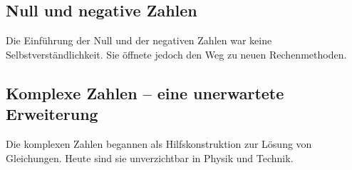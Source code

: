 \subsection{Null und negative Zahlen}
Die Einführung der Null und der negativen Zahlen war keine Selbstverständlichkeit. 
Sie öffnete jedoch den Weg zu neuen Rechenmethoden. 

\subsection{Komplexe Zahlen – eine unerwartete Erweiterung}
Die komplexen Zahlen begannen als Hilfskonstruktion zur Lösung von Gleichungen. 
Heute sind sie unverzichtbar in Physik und Technik. 
